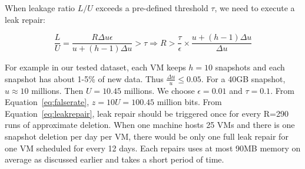 When leakage ratio $L/U$ exceeds a pre-defined threshold $\tau$, we need to execute a leak repair:

\begin{equation}
\label{eq:leakrepair}
\frac{L}{U} = \frac{R \Delta u \epsilon}{u+(h-1)\Delta u } > \tau 
\Longrightarrow R > \frac{\tau}{\epsilon}\times\frac{u + (h-1)\Delta u}{\Delta u}
\end{equation}

For example in our tested dataset,  
each VM keeps $h=10$ snapshots and each snapshot has
about 1-5\% of new data. Thus $\frac{\Delta u}{u} \leq 0.05$. For a 40GB snapshot, $u\approx  10$ millions.
Then $U=10.45$ millions.
We choose  $\epsilon = 0.01$ and $\tau=0.1$.  From Equation~\ref{eq:falserate}, 
$z=10U=100.45$ million bits. From Equation~\ref{eq:leakrepair}, 
leak repair should be triggered once for every R=290 runs of approximate deletion. 
When one machine hosts 25 VMs and there is one snapshot deletion per day per VM, there would be 
only one full leak repair for one VM scheduled for every 12 days. Each repairs uses at most  90MB memory on average
as discussed earlier and takes a short period of time.
